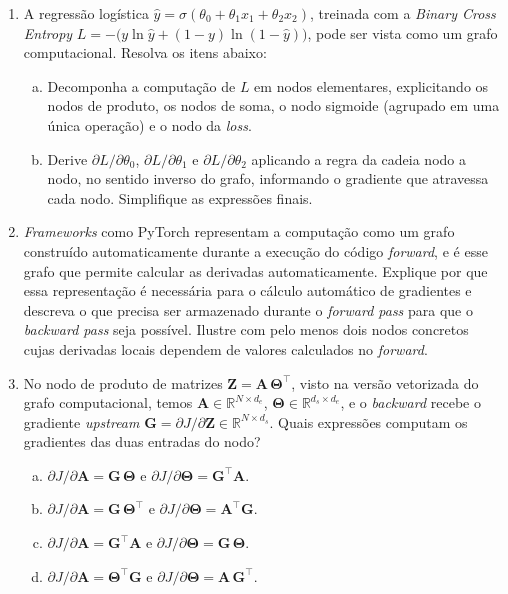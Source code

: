 \documentclass{dlproblemset}
\begin{document}
\begin{enumerate}[1)]
    \item A regressão logística $\hat{y} = \sigma(\theta_0 + \theta_1 x_1 + \theta_2 x_2)$, treinada com a \textit{Binary Cross Entropy} $L = -\bigl(y\ln\hat{y} + (1-y)\ln(1-\hat{y})\bigr)$, pode ser vista como um grafo computacional. Resolva os itens abaixo:
    \begin{enumerate}[a)]
        \item Decomponha a computação de $L$ em nodos elementares, explicitando os nodos de produto, os nodos de soma, o nodo sigmoide (agrupado em uma única operação) e o nodo da \textit{loss}.
        \item Derive $\partial L/\partial \theta_0$, $\partial L/\partial \theta_1$ e $\partial L/\partial \theta_2$ aplicando a regra da cadeia nodo a nodo, no sentido inverso do grafo, informando o gradiente que atravessa cada nodo. Simplifique as expressões finais.
    \end{enumerate}

    \item \textit{Frameworks} como PyTorch representam a computação como um grafo construído automaticamente durante a execução do código \textit{forward}, e é esse grafo que permite calcular as derivadas automaticamente. Explique por que essa representação é necessária para o cálculo automático de gradientes e descreva o que precisa ser armazenado durante o \textit{forward pass} para que o \textit{backward pass} seja possível. Ilustre com pelo menos dois nodos concretos cujas derivadas locais dependem de valores calculados no \textit{forward}.

    \item No nodo de produto de matrizes $\mathbf{Z} = \mathbf{A}\,\mathbf{\Theta}^{\top}$, visto na versão vetorizada do grafo computacional, temos $\mathbf{A} \in \mathbb{R}^{N\times d_e}$, $\mathbf{\Theta} \in \mathbb{R}^{d_s\times d_e}$, e o \textit{backward} recebe o gradiente \textit{upstream} $\mathbf{G} = \partial J/\partial \mathbf{Z} \in \mathbb{R}^{N\times d_s}$. Quais expressões computam os gradientes das duas entradas do nodo?
    \begin{enumerate}[(a)]
        \item $\partial J/\partial \mathbf{A} = \mathbf{G}\,\mathbf{\Theta}$ e $\partial J/\partial \mathbf{\Theta} = \mathbf{G}^{\top}\mathbf{A}$.
        \item $\partial J/\partial \mathbf{A} = \mathbf{G}\,\mathbf{\Theta}^{\top}$ e $\partial J/\partial \mathbf{\Theta} = \mathbf{A}^{\top}\mathbf{G}$.
        \item $\partial J/\partial \mathbf{A} = \mathbf{G}^{\top}\mathbf{A}$ e $\partial J/\partial \mathbf{\Theta} = \mathbf{G}\,\mathbf{\Theta}$.
        \item $\partial J/\partial \mathbf{A} = \mathbf{\Theta}^{\top}\mathbf{G}$ e $\partial J/\partial \mathbf{\Theta} = \mathbf{A}\,\mathbf{G}^{\top}$.
    \end{enumerate}


\end{enumerate}
\end{document}
